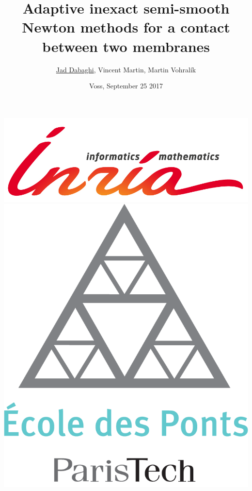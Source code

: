 \documentclass[10 pt]{beamer}
\title[Enumath 2017]{Adaptive inexact semi-smooth Newton methods for a contact between two membranes}
\author[Jad Dabaghi]{\underline{Jad Dabaghi}, Vincent Martin, Martin Vohral\'ik}
\institute[]{Inria Paris \& Université Paris-Est}
\date{Voss, September 25 2017}
\begin{document}

\begin{frame}
\maketitle
\includegraphics[scale=0.3]{INRIA-SCIENTIFIQUE-UK-RVB}
\hfill \includegraphics[scale=0.08]{Logo_ponts_paristech}

\end{frame}
\end{document}
